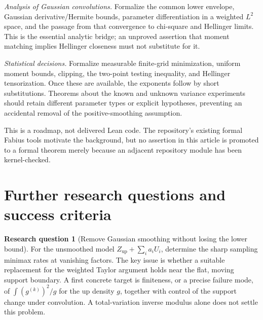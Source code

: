 \documentclass[11pt,a4paper]{article}
\numberwithin{equation}{section}
\theoremstyle{definition}
\newtheorem{problem}{Research question}
\theoremstyle{remark}
\begin{document}
\emph{Analysis of Gaussian convolutions.} Formalize the common lower envelope,
Gaussian derivative/Hermite bounds, parameter differentiation in a weighted
$L^2$ space, and the passage from that convergence to chi-square and Hellinger
limits. This is the essential analytic bridge; an unproved assertion that
moment matching implies Hellinger closeness must not substitute for it.

\emph{Statistical decisions.} Formalize measurable finite-grid minimization,
uniform moment bounds, clipping, the two-point testing inequality, and
Hellinger tensorization. Once these are available, the exponents follow by
short substitutions. Theorems about the known and unknown variance experiments
should retain different parameter types or explicit hypotheses, preventing
an accidental removal of the positive-smoothing assumption.

This is a roadmap, not delivered Lean code. The repository's existing formal
Fabius tools motivate the background, but no assertion in this article is
promoted to a formal theorem merely because an adjacent repository module
has been kernel-checked.

\section{Further research questions and success criteria}
\label{sec:future}

\begin{problem}[Remove Gaussian smoothing without losing the lower bound]
For the unsmoothed model $Z_{\mathrm{up}}+\sum_i a_iU_i$, determine the sharp
sampling minimax rates at vanishing factors. The key issue is whether a
suitable replacement for the weighted Taylor argument holds near the flat,
moving support boundary. A first concrete target is finiteness, or a precise
failure mode, of $\int (g^{(k)})^2/g$ for the up density $g$, together with
control of the support change under convolution. A total-variation inverse
modulus alone does not settle this problem.
\end{problem}
\end{document}
